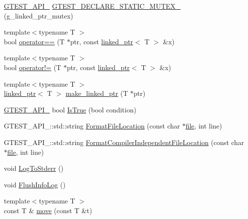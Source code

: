 \begin{DoxyCompactItemize}
\item 
\hyperlink{gtest-port_8h_aa73be6f0ba4a7456180a94904ce17790}{G\+T\+E\+S\+T\+\_\+\+A\+P\+I\+\_\+} \hyperlink{namespacetesting_1_1internal_ad7c5625384cf5f6b714188f274537ef6}{G\+T\+E\+S\+T\+\_\+\+D\+E\+C\+L\+A\+R\+E\+\_\+\+S\+T\+A\+T\+I\+C\+\_\+\+M\+U\+T\+E\+X\+\_\+} (g\+\_\+linked\+\_\+ptr\+\_\+mutex)
\item 
{\footnotesize template$<$typename T $>$ }\\bool \hyperlink{namespacetesting_1_1internal_ad1cb54a206a209ddace17a05359d38ae}{operator==} (T $\ast$ptr, const \hyperlink{classtesting_1_1internal_1_1linked__ptr}{linked\+\_\+ptr}$<$ T $>$ \&x)
\item 
{\footnotesize template$<$typename T $>$ }\\bool \hyperlink{namespacetesting_1_1internal_a6910869259f8f31825b471e9190fa09a}{operator!=} (T $\ast$ptr, const \hyperlink{classtesting_1_1internal_1_1linked__ptr}{linked\+\_\+ptr}$<$ T $>$ \&x)
\item 
{\footnotesize template$<$typename T $>$ }\\\hyperlink{classtesting_1_1internal_1_1linked__ptr}{linked\+\_\+ptr}$<$ T $>$ \hyperlink{namespacetesting_1_1internal_a0d79fad1f772844eff35dfe955f24fd6}{make\+\_\+linked\+\_\+ptr} (T $\ast$ptr)
\item 
\hyperlink{gtest-port_8h_aa73be6f0ba4a7456180a94904ce17790}{G\+T\+E\+S\+T\+\_\+\+A\+P\+I\+\_\+} bool \hyperlink{namespacetesting_1_1internal_a527b9bcc13669b9a16400c8514266254}{Is\+True} (bool condition)
\item 
G\+T\+E\+S\+T\+\_\+\+A\+P\+I\+\_\+\+::std\+::string \hyperlink{namespacetesting_1_1internal_a31b7c3abed4a7c395f42c61e993989f4}{Format\+File\+Location} (const char $\ast$\hyperlink{_07copy_08_2_read_camera_model_8m_a151631b2fd2bb776ef06c9f440a7ed74}{file}, int line)
\item 
G\+T\+E\+S\+T\+\_\+\+A\+P\+I\+\_\+\+::std\+::string \hyperlink{namespacetesting_1_1internal_a1ee4cde97868c53e442d3182496a9f3c}{Format\+Compiler\+Independent\+File\+Location} (const char $\ast$\hyperlink{_07copy_08_2_read_camera_model_8m_a151631b2fd2bb776ef06c9f440a7ed74}{file}, int line)
\item 
void \hyperlink{namespacetesting_1_1internal_a06b1b20029fbd1dbeb59752f914fab84}{Log\+To\+Stderr} ()
\item 
void \hyperlink{namespacetesting_1_1internal_a2135f223bf6b527729aeaa651115183b}{Flush\+Info\+Log} ()
\item 
{\footnotesize template$<$typename T $>$ }\\const T \& \hyperlink{namespacetesting_1_1internal_a0f6d06bf8c3093b9c22bb08723db201e}{move} (const T \&t)

\end{DoxyCompactItemize}
